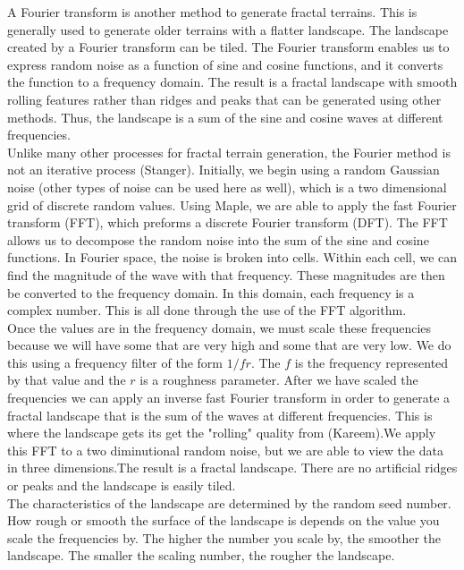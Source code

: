 \documentclass{article}
\begin{document}
	\indent A Fourier transform is another method to generate fractal terrains. This is generally used to generate older terrains with a flatter landscape. The landscape created by a Fourier transform can be tiled. The Fourier transform enables us to express random noise as a function of sine and cosine functions, and it converts the function to a frequency domain. The result is a fractal landscape with smooth rolling features rather than ridges and peaks that can be generated using other methods. Thus, the landscape is a sum of the sine and cosine waves at different frequencies.	\\
	\indent Unlike many other processes for fractal terrain generation, the Fourier method is not an iterative process (Stanger). Initially, we begin using a random Gaussian noise (other types of noise can be used here as well), which is a two dimensional grid of discrete random values. Using Maple, we are able to apply the fast Fourier transform (FFT), which preforms a discrete Fourier transform (DFT). The FFT allows us to decompose the random noise into the sum of the sine and cosine functions. In Fourier space, the noise is broken into cells. Within each cell, we can find the magnitude of the wave with that frequency. These magnitudes are then be converted to the frequency domain. In this domain, each frequency is a complex number. This is all done through the use of the FFT algorithm. \\
	\indent Once the values are in the frequency domain, we must scale these frequencies because we will have some that are very high and some that are very low. We do this using a frequency filter of the form $1/fr$. The $f$ is the frequency represented by that value and the $r$ is a roughness parameter. After we have scaled the frequencies we can apply an inverse fast Fourier transform in order to generate a fractal landscape that is the sum of the waves at different frequencies. This is where the landscape gets its get the "rolling" quality from (Kareem).We apply this FFT to a two diminutional random noise, but we are able to view the data in three dimensions.The result is a fractal landscape. There are no artificial ridges or peaks and the landscape is easily tiled.\\
	\indent   The characteristics of the landscape are determined by the random seed number. How rough or smooth the surface of the landscape is depends on the value you scale the frequencies by. The higher the number you scale by, the smoother the landscape. The smaller the scaling number, the rougher the landscape.
\end{document}
